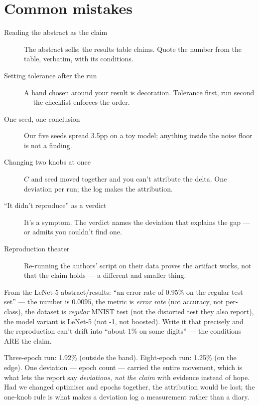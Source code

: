 \section{Common mistakes}
\label{sec:papermistakes}

\begin{description}
\item[Reading the abstract as the claim] The abstract sells; the
results table claims. Quote the number from the table, verbatim,
with its conditions.
\item[Setting tolerance after the run] A band chosen around your
result is decoration. Tolerance first, run second --- the checklist
enforces the order.
\item[One seed, one conclusion] Our five seeds spread 3.5pp on a
toy model; anything inside the noise floor is not a finding.
\item[Changing two knobs at once] $C$ and seed moved together and
you can't attribute the delta. One deviation per run; the log makes
the attribution.
\item[``It didn't reproduce'' as a verdict] It's a symptom. The
verdict names the deviation that explains the gap --- or admits
you couldn't find one.
\item[Reproduction theater] Re-running the authors' script on their
data proves the artifact works, not that the claim holds --- a
different and smaller thing.
\end{description}

\begin{example}
\label{ex:claim}
From the LeNet-5 abstract/results: ``an error rate of 0.95\% on the
regular test set'' --- the number is $0.0095$, the metric is
\emph{error rate} (not accuracy, not per-class), the dataset is
\emph{regular} MNIST test (not the distorted test they also report),
the model variant is LeNet-5 (not -1, not boosted). Write it that
precisely and the reproduction can't drift into ``about 1\% on some
digits'' --- the conditions ARE the claim.
\end{example}
\begin{example}
\label{ex:deviate}
Three-epoch run: 1.92\% (outside the band). Eight-epoch run: 1.25\%
(on the edge). One deviation --- epoch count --- carried the entire
movement, which is what lets the report say \emph{deviations, not
the claim} with evidence instead of hope. Had we changed optimiser
and epochs together, the attribution would be lost; the one-knob
rule is what makes a deviation log a measurement rather than a
diary.
\end{example}

